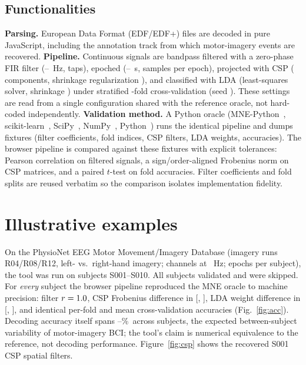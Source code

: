 \documentclass[5p]{elsarticle}
\begin{document}
\subsection{Functionalities}
\textbf{Parsing.} European Data Format (EDF/EDF+) files are decoded in pure JavaScript, including
the annotation track from which motor-imagery events are recovered.
\textbf{Pipeline.} Continuous signals are bandpass filtered with a zero-phase FIR filter
(\FirLo--\FirHi~Hz, \FirTaps{} taps), epoched (\Tmin--\Tmax~s, \Ntimes{} samples per epoch),
projected with CSP (\CspComp{} components, shrinkage regularization \CspReg{}), and classified with
LDA (least-squares solver, shrinkage \LdaShrink{}) under stratified \Folds-fold cross-validation
(seed \Seed{}). These settings are read from a single configuration shared with the reference
oracle, not hard-coded independently.
\textbf{Validation method.} A Python oracle (MNE-Python~\MneVer{}, scikit-learn~\SklearnVer{},
SciPy~\ScipyVer{}, NumPy~\NumpyVer{}, Python~\PyVer{}) runs the identical pipeline and dumps
fixtures (filter coefficients, fold indices, CSP filters, LDA weights, accuracies). The browser
pipeline is compared against these fixtures with explicit tolerances: Pearson correlation on
filtered signals, a sign/order-aligned Frobenius norm on CSP matrices, and a paired $t$-test on
fold accuracies. Filter coefficients and fold splits are reused verbatim so the comparison isolates
implementation fidelity.

\section{Illustrative examples}
On the PhysioNet EEG Motor Movement/Imagery Database (imagery runs R04/R08/R12, left- vs.\
right-hand imagery; \Nchannels{} channels at \Fs~Hz; \Nepochs{} epochs per subject), the tool was
run on subjects S001--S010. All \Nsubjects{} subjects validated and \Nskipped{} were skipped. For
\emph{every} subject the browser pipeline reproduced the MNE oracle to machine precision: filter
$r=1.0$, CSP Frobenius difference in [\CspFrobMin{}, \CspFrobMax{}], LDA weight difference in
[\LdaDiffMin{}, \LdaDiffMax{}], and identical per-fold and mean cross-validation accuracies
(Fig.~\ref{fig:acc}). Decoding accuracy itself spans \AccMin--\AccMax\%\ across subjects, the
expected between-subject variability of motor-imagery BCI; the tool's claim is numerical
equivalence to the reference, not decoding performance. Figure~\ref{fig:csp} shows the recovered
S001 CSP spatial filters.
\end{document}
